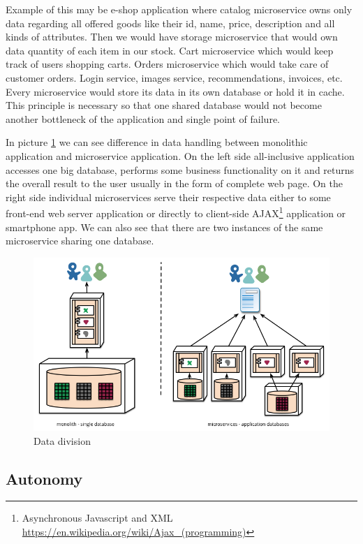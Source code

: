 \documentclass[12pt,oneside]{fithesis2}
\begin{document}
Example of this may be e-shop application where catalog microservice owns only data regarding all offered goods like their id, name, price, description and all kinds of attributes. Then we would have storage microservice that would own data quantity of each item in our stock. Cart microservice which would keep track of users shopping carts. Orders microservice which would take care of customer orders. Login service, images service, recommendations, invoices, etc.
Every microservice would store its data in its own database or hold it in cache. This principle is necessary so that one shared database would not become another bottleneck of the application and single point of failure.

In picture \ref{decentralised_data} we can see difference in data handling between monolithic application and microservice application. On the left side all-inclusive application accesses one big database, performs some business functionality on it and returns the overall result to the user usually in the form of complete web page. On the right side individual microservices serve their respective data either to some front-end web server application or directly to client-side AJAX\footnote{Asynchronous Javascript and XML \url{https://en.wikipedia.org/wiki/Ajax_(programming)}} application or smartphone app. We can also see that there are two instances of the same microservice sharing one database.

\begin{figure}[ht!]
	\label{decentralised_data}
	\centering
	\includegraphics[width=\textwidth]{images/decentralised_data.png}
	\caption{Data division \cite{mf}}
\end{figure}

\subsection{Autonomy}
\end{document}
